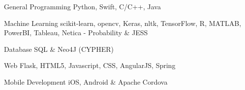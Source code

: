 

\begin{cvskills}

  \cvskill
    {General Programming} %
    {Python, Swift, C/C++, Java} %

  \cvskill
    {Machine Learning} %
    {scikit-learn, opencv, Keras, nltk, TensorFlow, R, MATLAB, PowerBI, Tableau, Netica - Probability \& JESS} %

  \cvskill
    {Database} %
    {SQL \& Neo4J (CYPHER)} %

  \cvskill
    {Web} %
    {Flask,  HTML5, Javascript, CSS, AngularJS, Spring} %

  \cvskill
    {Mobile Development} %
    {iOS, Android \& Apache Cordova} %
\end{cvskills}
